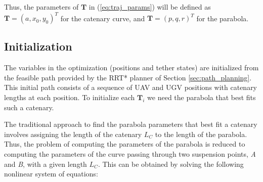 \noindent Thus, the parameters of $\mathbf{T}$ in (\ref{eq:traj_params}) will be defined as \mbox{$\mathbf{T}=(a, x_0, y_0)^T$} for the catenary curve, and $\mathbf{T}=(p,q,r)^T$ for the parabola.


\subsection{Initialization}
\label{sec:mathappoach}


The variables in the optimization (positions and tether states) are initialized from the feasible path provided by the RRT* planner of Section \ref{sec:path_planning}. This initial path consists of a sequence of UAV and UGV positions with catenary lengths at each position. To initialize each $\mathbf{T}_i$ we need the parabola that best fits such a catenary.


The traditional approach \cite{9337759} to find the parabola parameters that best fit a catenary involves assigning the length of the catenary $L_C$ to the length of the parabola. Thus, the problem of computing the parameters of the parabola is reduced to computing the parameters of the curve passing through two suspension points, \emph{A} and \emph{B}, with a given length $L_C$. This can be obtained by solving the following nonlinear system of equations:

